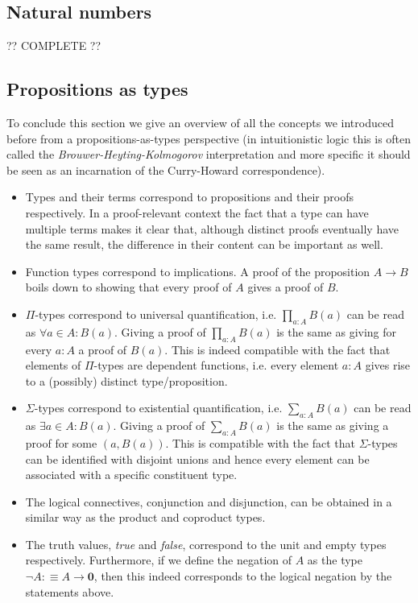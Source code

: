 \subsection{Natural numbers}

    ?? COMPLETE ??

\subsection{Propositions as types}

    To conclude this section we give an overview of all the concepts we introduced before from a propositions-as-types perspective (in intuitionistic logic this is often called the \textit{Brouwer-Heyting-Kolmogorov} interpretation and more specific it should be seen as an incarnation of the Curry-Howard correspondence).

    \begin{itemize}
        \item Types and their terms correspond to propositions and their proofs respectively. In a proof-relevant context the fact that a type can have multiple terms makes it clear that, although distinct proofs eventually have the same result, the difference in their content can be important as well.
        \item Function types correspond to implications. A proof of the proposition $A\rightarrow B$ boils down to showing that every proof of $A$ gives a proof of $B$.
        \item $\Pi$-types correspond to universal quantification, i.e. $\prod_{a:A}B(a)$ can be read as $\forall a\in A: B(a)$. Giving a proof of $\prod_{a:A}B(a)$ is the same as giving for every $a:A$ a proof of $B(a)$. This is indeed compatible with the fact that elements of $\Pi$-types are dependent functions, i.e. every element $a:A$ gives rise to a (possibly) distinct type/proposition.
        \item $\Sigma$-types correspond to existential quantification, i.e. $\sum_{a:A}B(a)$ can be read as $\exists a\in A:B(a)$. Giving a proof of $\sum_{a:A}B(a)$ is the same as giving a proof for some $(a, B(a))$. This is compatible with the fact that $\Sigma$-types can be identified with disjoint unions and hence every element can be associated with a specific constituent type.
        \item The logical connectives, conjunction and disjunction, can be obtained in a similar way as the product and coproduct types.
        \item The truth values, \textit{true} and \textit{false}, correspond to the unit and empty types respectively. Furthermore, if we define the negation of $A$ as the type $\lnot A:\equiv A\rightarrow\mathbf{0}$, then this indeed corresponds to the logical negation by the statements above.
    \end{itemize}


